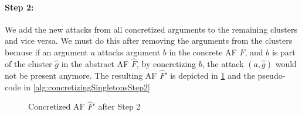 \paragraph{Step 2:} We add the new attacks from all concretized arguments to the remaining clusters and vice versa. We must do this after removing the arguments from the clusters because if an argument $a$ attacks argument $b$ in the concrete AF $F$, and $b$ is part of the cluster $\hat{g}$ in the abstract AF $\hat{F}$, by concretizing $b$, the attack $(a,\hat{g})$ would not be present anymore. The resulting AF $\hat{F}'$ is depicted in \cref{example:algorithmConcretizeSingletonsStep2} and the pseudo-code in \cref{alg:concretizingSingletonsStep2}


\vspace{0.3cm}
\begin{figure}[h]
    \centering
    \caption{Concretized AF $\hat{F}'$ after Step 2}
    \label{example:algorithmConcretizeSingletonsStep2}
\end{figure}
\vspace{-0.2cm}



